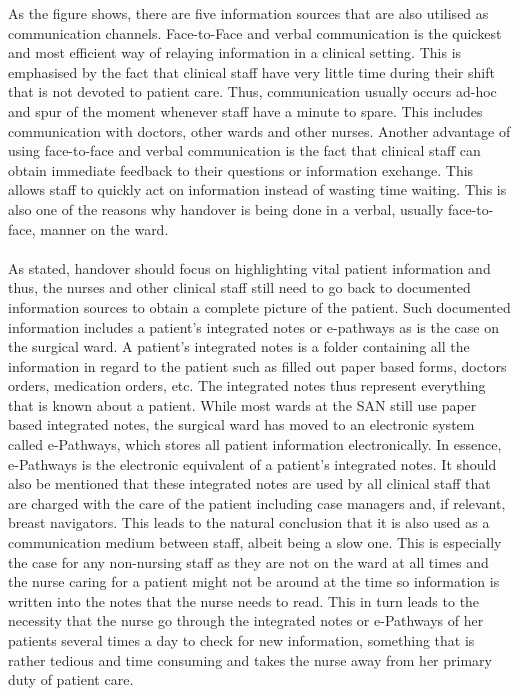\noindent As the figure shows, there are five information sources that are also utilised as communication channels. Face-to-Face and verbal communication is the quickest and most efficient way of relaying information in a clinical setting. This is emphasised by the fact that clinical staff have very little time during their shift that is not devoted to patient care. Thus, communication usually occurs ad-hoc and spur of the moment whenever staff have a minute to spare. This includes communication with doctors, other wards and other nurses. Another advantage of using face-to-face and verbal communication is the fact that clinical staff can obtain immediate feedback to their questions or information exchange. This allows staff to quickly act on information instead of wasting time waiting. This is also one of the reasons why handover is being done in a verbal, usually face-to-face, manner on the ward. 
\\ \\
As stated, handover should focus on highlighting vital patient information and thus, the nurses and other clinical staff still need to go back to documented information sources to obtain a complete picture of the patient. Such documented information includes a patient's integrated notes or e-pathways as is the case on the surgical ward. A patient's integrated notes is a folder containing all the information in regard to the patient such as filled out paper based forms, doctors orders, medication orders, etc. The integrated notes thus represent everything that is known about a patient. While most wards at the SAN still use paper based integrated notes, the surgical ward has moved to an electronic system called e-Pathways, which stores all patient information electronically. In essence, e-Pathways is the electronic equivalent of a patient's integrated notes. It should also be mentioned that these integrated notes are used by all clinical staff that are charged with the care of the patient including case managers and, if relevant, breast navigators. This leads to the natural conclusion that it is also used as a communication medium between staff, albeit being a slow one. This is especially the case for any non-nursing staff as they are not on the ward at all times and the nurse caring for a patient might not be around at the time so information is written into the notes that the nurse needs to read. This in turn leads to the necessity that the nurse go through the integrated notes or e-Pathways of her patients several times a day to check for new information, something that is rather tedious and time consuming and takes the nurse away from her primary duty of patient care.
